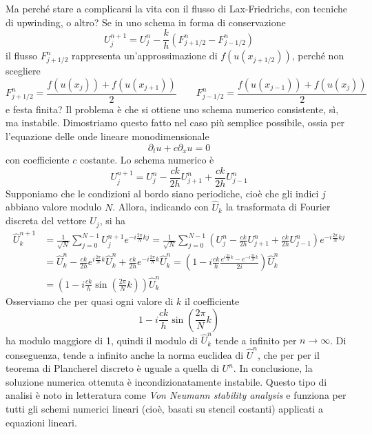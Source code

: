 Ma perché stare a complicarsi la vita con il flusso di Lax-Friedrichs,
con tecniche di upwinding, o altro? Se in uno schema in forma di conservazione
\begin{equation} \label{eq:schema-forma-conservazione}
U_j^{n+1} = U_j^n - \frac{k}{h} (F_{j+1/2}^n - F_{j-1/2}^n)
\end{equation}
il flusso $F_{j+1/2}^n$ rappresenta un'approssimazione di
$f(u(x_{j+1/2}))$, perché non scegliere
\[
F_{j+1/2}^n = \frac{f(u(x_{j})) + f(u(x_{j+1}))}{2}
\qquad
F_{j-1/2}^n = \frac{f(u(x_{j-1})) + f(u(x_{j}))}{2}
\]
e festa finita? Il problema è che si ottiene uno schema numerico consistente,
sì, ma instabile. Dimostriamo questo fatto nel caso più semplice possibile,
ossia per l'equazione delle onde lineare monodimensionale
\[
\partial_t u + c \partial_x u = 0
\]
con coefficiente $c$ costante.
Lo schema numerico è
\[
U_j^{n+1} = U_j^n - \frac{ck}{2h} U_{j+1}^n + \frac{ck}{2h} U_{j-1}^n
\]
Supponiamo che le condizioni al bordo siano periodiche,
cioè che gli indici $j$ abbiano valore modulo $N$.
Allora, indicando con $\hat{U}_k$ la trasformata di Fourier discreta
del vettore $U_j$, si ha
\begin{align*}
\hat{U}^{n+1}_k
& = \frac{1}{\sqrt{N}} \sum_{j=0}^{N-1} U^{n+1}_j e^{-i \frac{2\pi}{N} kj}
  = \frac{1}{\sqrt{N}} \sum_{j=0}^{N-1} \left(
	U_j^n - \frac{ck}{2h} U_{j+1}^n + \frac{ck}{2h} U_{j-1}^n
	\right) e^{-i \frac{2\pi}{N} kj} \\
& = \hat{U}^n_k
  - \frac{ck}{2h} e^{i \frac{2\pi}{N} k} \hat{U}^n_k
  + \frac{ck}{2h} e^{-i \frac{2\pi}{N} k} \hat{U}^n_k
  = \left(1 - i \frac{ck}{h} \frac{e^{i \frac{2\pi}{N} k}
                                  -e^{-i \frac{2\pi}{N} k}}{2i}
    \right) \hat{U}^n_k \\
& = \left(1 - i \frac{ck}{h} \sin(\frac{2\pi}{N} k)
    \right) \hat{U}^n_k
\end{align*}
Osserviamo che per quasi ogni valore di $k$ il coefficiente
\[
1 - i \frac{ck}{h} \sin(\frac{2\pi}{N} k)
\]
ha modulo maggiore di 1, quindi il modulo di $\hat{U}^n_k$ tende
a infinito per $n \to \infty$. Di conseguenza, tende a infinito anche la norma
euclidea di $\hat{U}^n$, che per per il teorema di Plancherel discreto
è uguale a quella di $U^n$. In conclusione, la soluzione numerica ottenuta
è incondizionatamente instabile.
Questo tipo di analisi è noto in letteratura come \emph{Von Neumann stability analysis}
e funziona per tutti gli schemi numerici lineari (cioè, basati su
stencil costanti) applicati a equazioni lineari.

